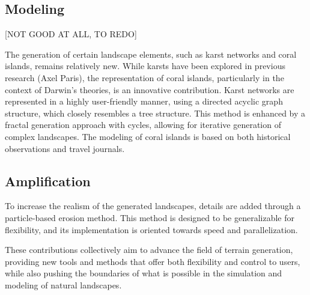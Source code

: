 \subsection{Modeling}

[NOT GOOD AT ALL, TO REDO]

The generation of certain landscape elements, such as karst networks and coral islands, remains relatively new. While karsts have been explored in previous research (Axel Paris), the representation of coral islands, particularly in the context of Darwin's theories, is an innovative contribution. Karst networks are represented in a highly user-friendly manner, using a directed acyclic graph structure, which closely resembles a tree structure. This method is enhanced by a fractal generation approach with cycles, allowing for iterative generation of complex landscapes. The modeling of coral islands is based on both historical observations and travel journals.

\subsection{Amplification}
To increase the realism of the generated landscapes, details are added through a particle-based erosion method. This method is designed to be generalizable for flexibility, and its implementation is oriented towards speed and parallelization. 

These contributions collectively aim to advance the field of terrain generation, providing new tools and methods that offer both flexibility and control to users, while also pushing the boundaries of what is possible in the simulation and modeling of natural landscapes.







